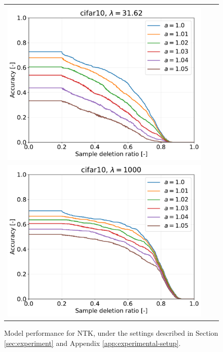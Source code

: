 \begin{figure}[H]
\begin{tabular}{ccc}
\begin{minipage}[b]{0.3\hsize}\centering {\small Dataset: CIFAR10, $\lambda=n \cdot 10^{-1.5}$}\\\includegraphics[width=0.8\hsize]{fig/table_logistic/cifar10-logistic/cntk/cntk_ss_screening_rate_lam31.62_x_n_y_etest.pdf}\end{minipage}
&
\begin{minipage}[b]{0.3\hsize}\centering {\small Dataset: CIFAR10, $\lambda=n$}\\\includegraphics[width=0.8\hsize]{fig/table_logistic/cifar10-logistic/cntk/cntk_ss_screening_rate_lam1000_x_n_y_etest.pdf}\end{minipage}

\end{tabular}
\caption{Model performance for NTK, under the settings described in Section \ref{sec:experiment} and Appendix \ref{app:experimental-setup}.}
\label{fig:result-ntk-acc}
\end{figure}